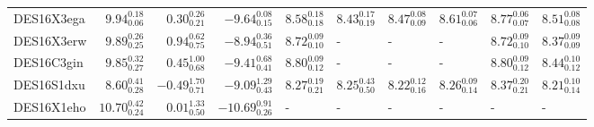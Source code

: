 \documentclass[fleqn,usenatbib,]{mnras}
\begin{document}
\begin{table}
\begin{threeparttable}
\begin{tabular}{lrrrllllll}
DES16X3ega &   $9.94 _{\scriptscriptstyle 0.06} ^{\scriptscriptstyle 0.18}$ &   $0.30 _{\scriptscriptstyle 0.21} ^{\scriptscriptstyle 0.26}$ &   $-9.64 _{\scriptscriptstyle 0.15} ^{\scriptscriptstyle 0.08}$ &  $8.58 _{\scriptscriptstyle 0.18} ^{\scriptscriptstyle 0.18}$ &  $8.43 _{\scriptscriptstyle 0.19} ^{\scriptscriptstyle 0.17}$ &  $8.47 _{\scriptscriptstyle 0.09} ^{\scriptscriptstyle 0.08}$ &  $8.61 _{\scriptscriptstyle 0.06} ^{\scriptscriptstyle 0.07}$ &  $8.77 _{\scriptscriptstyle 0.07} ^{\scriptscriptstyle 0.06}$ &   $8.51 _{\scriptscriptstyle 0.08} ^{\scriptscriptstyle 0.08}$ \\
DES16X3erw &   $9.89 _{\scriptscriptstyle 0.25} ^{\scriptscriptstyle 0.26}$ &   $0.94 _{\scriptscriptstyle 0.75} ^{\scriptscriptstyle 0.62}$ &   $-8.94 _{\scriptscriptstyle 0.51} ^{\scriptscriptstyle 0.36}$ &  $8.72 _{\scriptscriptstyle 0.10} ^{\scriptscriptstyle 0.09}$ &                                                             - &                                                             - &                                                             - &  $8.72 _{\scriptscriptstyle 0.10} ^{\scriptscriptstyle 0.09}$ &   $8.37 _{\scriptscriptstyle 0.09} ^{\scriptscriptstyle 0.09}$ \\
DES16C3gin &   $9.85 _{\scriptscriptstyle 0.27} ^{\scriptscriptstyle 0.32}$ &   $0.45 _{\scriptscriptstyle 0.68} ^{\scriptscriptstyle 1.00}$ &   $-9.41 _{\scriptscriptstyle 0.41} ^{\scriptscriptstyle 0.68}$ &  $8.80 _{\scriptscriptstyle 0.12} ^{\scriptscriptstyle 0.09}$ &                                                             - &                                                             - &                                                             - &  $8.80 _{\scriptscriptstyle 0.12} ^{\scriptscriptstyle 0.09}$ &   $8.44 _{\scriptscriptstyle 0.12} ^{\scriptscriptstyle 0.10}$ \\
DES16S1dxu &   $8.60 _{\scriptscriptstyle 0.28} ^{\scriptscriptstyle 0.41}$ &  $-0.49 _{\scriptscriptstyle 0.71} ^{\scriptscriptstyle 1.70}$ &   $-9.09 _{\scriptscriptstyle 0.43} ^{\scriptscriptstyle 1.29}$ &  $8.27 _{\scriptscriptstyle 0.21} ^{\scriptscriptstyle 0.19}$ &  $8.25 _{\scriptscriptstyle 0.50} ^{\scriptscriptstyle 0.43}$ &  $8.22 _{\scriptscriptstyle 0.16} ^{\scriptscriptstyle 0.12}$ &  $8.26 _{\scriptscriptstyle 0.14} ^{\scriptscriptstyle 0.09}$ &  $8.37 _{\scriptscriptstyle 0.21} ^{\scriptscriptstyle 0.20}$ &   $8.21 _{\scriptscriptstyle 0.14} ^{\scriptscriptstyle 0.10}$ \\
DES16X1eho &  $10.70 _{\scriptscriptstyle 0.24} ^{\scriptscriptstyle 0.42}$ &   $0.01 _{\scriptscriptstyle 0.50} ^{\scriptscriptstyle 1.33}$ &  $-10.69 _{\scriptscriptstyle 0.26} ^{\scriptscriptstyle 0.91}$ &                                                             - &                                                             - &                                                             - &                                                             - &                                                             - &                                                              - \\

\end{tabular}
\end{threeparttable}
\end{table}
\end{document}

